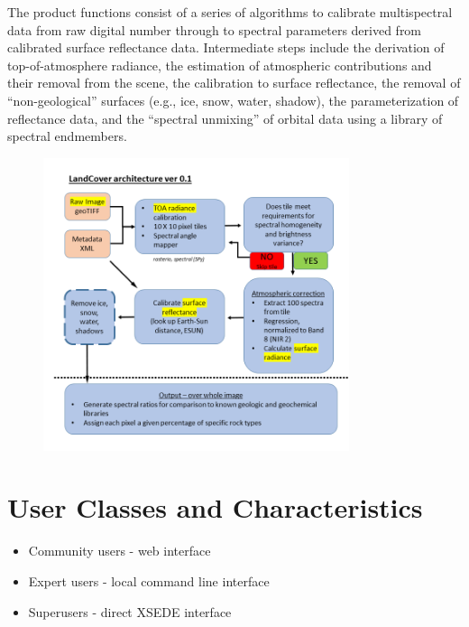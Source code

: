 \documentclass{scrreprt}
\begin{document}
The product functions consist of a series of algorithms to calibrate multispectral 
data from raw digital number through to spectral parameters derived from calibrated 
surface reflectance data.  Intermediate steps include the derivation of top-of-atmosphere 
radiance, the estimation of atmospheric contributions and their removal from the scene, 
the calibration to surface reflectance, the removal of ``non-geological'' surfaces 
(e.g., ice, snow, water, shadow), the parameterization of reflectance data, and the 
``spectral unmixing'' of orbital data using a library of spectral endmembers.

\begin{figure}[H]
 \centering
 \includegraphics[width=0.8\textwidth]{landcoverarch}
\end{figure}

\section{User Classes and Characteristics}

\begin{itemize}
	\item Community users - web interface
	\item Expert users - local command line interface
	\item Superusers - direct XSEDE interface
\end{itemize}
\end{document}
